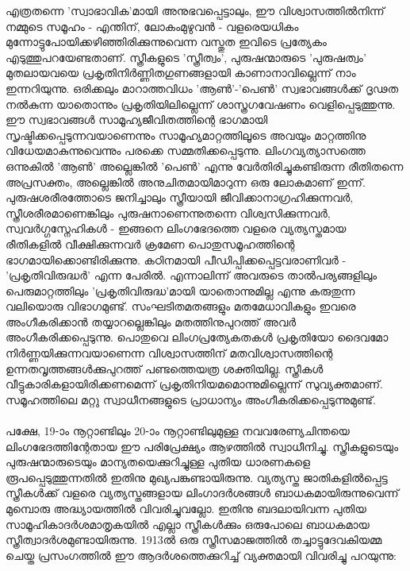 എത്രതന്നെ 'സ്വാഭാവിക'മായി അനുഭവപ്പെട്ടാലും, ഈ വിശ്വാസത്തിൽനിന്ന് നമ്മുടെ സമൂഹം - എന്തിന്, ലോകംമുഴുവൻ - വളരെയധികം മുന്നോട്ടുപോയിക്കഴിഞ്ഞിരിക്കുന്നുവെന്ന വസ്തുത ഇവിടെ പ്രത്യേകം എടുത്തുപറയേണ്ടതാണ്. സ്ത്രീകളുടെ 'സ്ത്രീത്വം', പുരുഷന്മാരുടെ 'പുരുഷത്വം' മുതലായവയെ പ്രകൃതിനിർണ്ണിതഗുണങ്ങളായി കാണാനാവില്ലെന്ന് നാം ഇന്നറിയുന്നു. ഒരിക്കലും മാറാത്തവിധം 'ആൺ'-'പെൺ' സ്വഭാവങ്ങൾക്ക് ദൃഢത നൽകുന്ന യാതൊന്നും പ്രകൃതിയിലില്ലെന്ന് ശാസ്ത്രഗവേഷണം വെളിപ്പെടുത്തുന്നു. ഈ സ്വഭാവങ്ങൾ സാമൂഹ്യജീവിതത്തിന്റെ ഭാഗമായി സൃഷ്ടിക്കപ്പെടുന്നവയാണെന്നും സാമൂഹ്യമാറ്റത്തിലൂടെ അവയും മാറ്റത്തിനു വിധേയമാകുന്നുവെന്നും പരക്കെ സമ്മതിക്കപ്പെടുന്നു. ലിംഗവ്യത്യാസത്തെ ഒന്നുകിൽ 'ആൺ' അല്ലെങ്കിൽ 'പെൺ' എന്നു വേർതിരിച്ചുകണ്ടിരുന്ന രീതിതന്നെ അപ്രസക്തം, അല്ലെങ്കിൽ അനുചിതമായിമാറുന്ന ഒരു ലോകമാണ് ഇന്ന്. പുരുഷശരീരത്തോടെ ജനിച്ചാലും സ്ത്രീയായി ജീവിക്കാനാഗ്രഹിക്കുന്നവർ, സ്ത്രീശരീരമാണെങ്കിലും പുരുഷനാണെന്നുതന്നെ വിശ്വസിക്കുന്നവർ, സ്വവർഗ്ഗസ്നേഹികൾ - ഇങ്ങനെ ലിംഗഭേദത്തെ വളരെ വ്യത്യസ്തമായ രീതികളിൽ വീക്ഷിക്കുന്നവർ ക്രമേണ പൊതുസമൂഹത്തിന്റെ ഭാഗമായിക്കൊണ്ടിരിക്കുന്നു. കഠിനമായി പീഡിപ്പിക്കപ്പെട്ടവരാണിവർ - 'പ്രകൃതിവിരുദ്ധർ' എന്ന പേരിൽ. എന്നാലിന്ന് അവരുടെ താൽപര്യങ്ങളിലും പെരുമാറ്റത്തിലും 'പ്രകൃതിവിരുദ്ധ'മായി യാതൊന്നുമില്ല എന്നു കരുതുന്ന വലിയൊരു വിഭാഗമുണ്ട്. സംഘടിതമതങ്ങളും മതമേധാവികളും ഇവരെ അംഗീകരിക്കാൻ തയ്യാറല്ലെങ്കിലും മതത്തിനുപുറത്ത് അവർ അംഗീകരിക്കപ്പെടുന്നു. പൊതുവെ ലിംഗപ്രത്യേകതകൾ പ്രകൃതിയോ ദൈവമോ നിർണ്ണയിക്കുന്നവയാണെന്ന വിശ്വാസത്തിന് മതവിശ്വാസത്തിന്റെ ഉന്നതവൃത്തങ്ങൾക്കുപുറത്ത് പണ്ടത്തെയത്ര ശക്തിയില്ല. സ്ത്രീകൾ വീട്ടുകാരികളായിരിക്കണമെന്ന് പ്രകൃതിനിയമമൊന്നുമില്ലെന്ന് സുവ്യക്തമാണ്. സമൂഹത്തിലെ മറ്റു സ്വാധീനങ്ങളുടെ പ്രാധാന്യം അംഗീകരിക്കപ്പെടുന്നുമുണ്ട്.

\paragraph{}പക്ഷേ, 19-ാം നൂറ്റാണ്ടിലും 20-ാം നൂറ്റാണ്ടിലുമുള്ള നവവരേണ്യചിന്തയെ ലിംഗഭേദത്തിന്റേതായ ഈ പരിപ്രേക്ഷ്യം ആഴത്തിൽ സ്വാധീനിച്ചു. സ്ത്രീകളുടെയും പുരുഷന്മാരുടെയും മാന്യതയെക്കുറിച്ചുള്ള പുതിയ ധാരണകളെ രൂപപ്പെടുത്തുന്നതിൽ ഇതിനു മുഖ്യപങ്കുണ്ടായിരുന്നു. വ്യത്യസ്ത ജാതികളിൽപ്പെട്ട സ്ത്രീകൾക്ക് വളരെ വ്യത്യസ്തങ്ങളായ ലിംഗാദർശങ്ങൾ ബാധകമായിരുന്നുവെന്ന് മുമ്പൊരു അദ്ധ്യായത്തിൽ വിവരിച്ചുവല്ലോ. ഇതിനു ബദലായിവന്ന പുതിയ സാമൂഹികാദർശമാതൃകയിൽ എല്ലാ സ്ത്രീകൾക്കും ഒരുപോലെ ബാധകമായ സ്ത്രീത്വാദർശമുണ്ടായിരുന്നു. 1913ൽ ഒരു സ്ത്രീസമാജത്തിൽ തച്ചാട്ടുദേവകിയമ്മ ചെയ്ത പ്രസംഗത്തിൽ ഈ ആദർശത്തെക്കുറിച്ച് വ്യക്തമായി വിവരിച്ചു പറയുന്നു:

